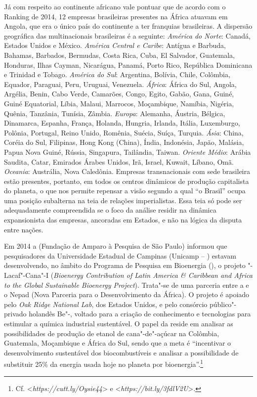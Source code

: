 Já com respeito ao continente africano vale pontuar que de acordo com o
Ranking  de 2014, 12 empresas brasileiras presentes na África atuavam
em Angola, que era o único país do continente a ter franquias
brasileiras. A dispersão geográfica das multinacionais brasileiras é a
seguinte: \emph{América do Norte}: Canadá, Estados Unidos e México.
\emph{América Central e Caribe}: Antígua e Barbuda, Bahamas, Barbados,
Bermudas, Costa Rica, Cuba, El Salvador, Guatemala, Honduras, Ilhas
Cayman, Nicarágua, Panamá, Porto Rico, República Dominicana e Trinidad e
Tobago. \emph{América do Sul}: Argentina, Bolívia, Chile, Colômbia,
Equador, Paraguai, Peru, Uruguai, Venezuela. \emph{África}: África do
Sul, Angola, Argélia, Benin, Cabo Verde, Camarões, Congo, Egito, Gabão,
Gana, Guiné, Guiné Equatorial, Líbia, Malaui, Marrocos, Moçambique,
Namíbia, Nigéria, Quênia, Tanzânia, Tunísia, Zâmbia. \emph{Europa}:
Alemanha, Áustria, Bélgica, Dinamarca, Espanha, França, Holanda,
Hungria, Irlanda, Itália, Luxemburgo, Polônia, Portugal, Reino Unido,
Romênia, Suécia, Suíça, Turquia. \emph{Ásia}: China, Coréia do Sul,
Filipinas, Hong Kong (China), Índia, Indonésia, Japão, Malásia, Papua
Nova Guiné, Rússia, Singapura, Tailândia, Taiwan. \emph{Oriente
Médio}: Arábia Saudita, Catar, Emirados Árabes Unidos, Irã, Israel,
Kuwait, Líbano, Omã. \emph{Oceania}: Austrália, Nova Caledônia.
Empresas transnacionais com sede brasileira estão presentes, portanto,
em todos os centros dinâmicos de produção capitalista do planeta, o que
nos permite repensar a visão segundo a qual ``o Brasil'' ocupa uma
posição subalterna na teia de relações imperialistas. Essa teia só pode
ser adequadamente compreendida se o foco da análise residir na dinâmica
expansionista das empresas, ancoradas em Estados, e não na lógica da
disputa entre nações.

Em 2014 a  (Fundação de Amparo à Pesquisa de São Paulo) informou
que pesquisadores da Universidade Estadual de Campinas (Unicamp -- )
estavam desenvolvendo, no âmbito do Programa  de Pesquisa em
Bioenergia (), o projeto "-Lacaf"-Cana"-I (\emph{Bioenergy
Contribution of Latin America \& Caribbean and Africa to the Global
Sustainable Bioenergy Project}). Trata"-se de uma parceria entre a 
e o Nepad (Nova Parceria para o Desenvolvimento da África). O projeto
 é apoiado pelo \emph{Oak Ridge National Lab}, dos Estados Unidos, e
pelo consórcio público"-privado holandês Be"-, voltado para a criação
de conhecimento e tecnologias para estimular a química industrial
sustentável. O papel da  reside em analisar as possibilidades de
produção de etanol de cana"-de"-açúcar na Colômbia, Guatemala, Moçambique
e África do Sul, sendo que a meta é ``incentivar o desenvolvimento
sustentável dos biocombustíveis e analisar a possibilidade de substituir
25\% da energia usada hoje no planeta por bioenergia''.\footnote{Cf.
  \textless{}\emph{https://cutt.ly/Oysie44}\textgreater{}
  e
  \textless{}\emph{https://bit.ly/3fdlV2U}\textgreater{}.}


